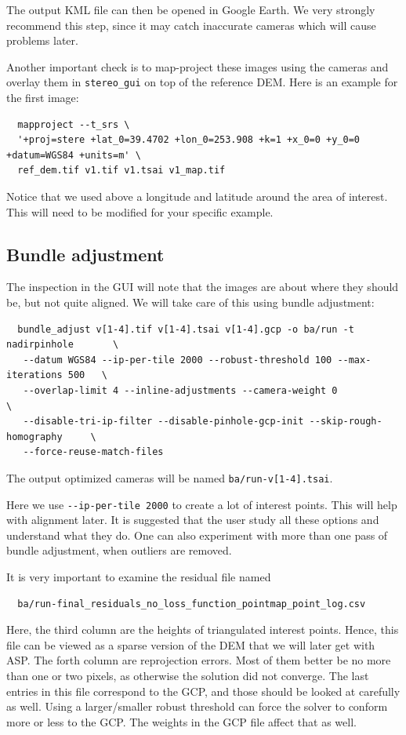 The output KML file can then be opened in Google Earth. We very strongly recommend this step, 
since it may catch inaccurate cameras which will cause problems later. 

Another important check is to map-project these images using the cameras
and overlay them in \texttt{stereo\_gui} on top of the reference
DEM. Here is an example for the first image:
\begin{verbatim}
  mapproject --t_srs \
  '+proj=stere +lat_0=39.4702 +lon_0=253.908 +k=1 +x_0=0 +y_0=0 +datum=WGS84 +units=m' \
  ref_dem.tif v1.tif v1.tsai v1_map.tif 
\end{verbatim}

Notice that we used above a longitude and latitude around the area of interest. This 
will need to be modified for your specific example. 

\subsection{Bundle adjustment}

The inspection in the GUI will note that the images are about where they
should be, but not quite aligned. We will take care of this using bundle
adjustment:

\begin{verbatim}
  bundle_adjust v[1-4].tif v[1-4].tsai v[1-4].gcp -o ba/run -t nadirpinhole       \
   --datum WGS84 --ip-per-tile 2000 --robust-threshold 100 --max-iterations 500   \
   --overlap-limit 4 --inline-adjustments --camera-weight 0                       \
   --disable-tri-ip-filter --disable-pinhole-gcp-init --skip-rough-homography     \
   --force-reuse-match-files
\end{verbatim}

The output optimized cameras will be named \texttt{ba/run-v[1-4].tsai}.

Here we use \texttt{-\/-ip-per-tile 2000} to create a lot of interest
points. This will help with alignment later. It is suggested that the
user study all these options and understand what they do. 
One can also experiment with more than one pass of bundle adjustment,
when outliers are removed. 

It is very important to examine the residual file named
\begin{verbatim}
  ba/run-final_residuals_no_loss_function_pointmap_point_log.csv
\end{verbatim}
Here, the third column are the heights of triangulated interest
points. Hence, this file can be viewed as a sparse version of the DEM
that we will later get with ASP. The forth column are reprojection
errors. Most of them better be no more than one or two pixels, as
otherwise the solution did not converge. The last entries in this
file correspond to the GCP, and those should be looked at carefully as well.
Using a larger/smaller robust threshold can force the solver to 
conform more or less to the GCP. The weights in the GCP file affect that as well.

